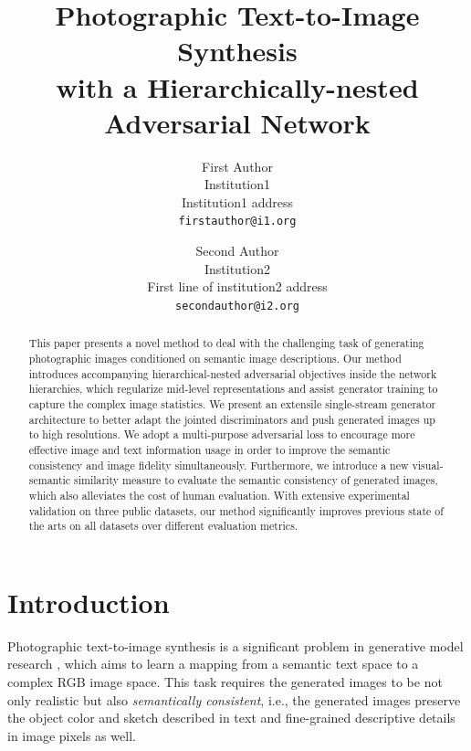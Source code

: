 \documentclass[10pt,twocolumn,letterpaper]{article}
\begin{document}
\title{Photographic Text-to-Image Synthesis \\ with a Hierarchically-nested Adversarial Network}

\author{First Author\\
Institution1\\
Institution1 address\\
{\tt\small firstauthor@i1.org}
\and
Second Author\\
Institution2\\
First line of institution2 address\\
{\tt\small secondauthor@i2.org}
}

\maketitle

\begin{abstract}
This paper presents a novel method to deal with the challenging task of generating photographic images conditioned on semantic image descriptions.
Our method introduces accompanying hierarchical-nested adversarial objectives inside the network hierarchies, which regularize mid-level representations and assist generator training to capture the complex image statistics. We present an extensile single-stream generator architecture to better adapt the jointed discriminators and push generated images up to high resolutions. We adopt a multi-purpose adversarial loss to encourage more effective image and text information usage in order to improve the semantic consistency and image fidelity simultaneously. Furthermore, we introduce a new visual-semantic similarity measure to evaluate the semantic consistency of generated images, which also alleviates the cost of human evaluation. With extensive experimental validation on three public datasets, our method significantly improves previous state of the arts on all datasets over different evaluation metrics. 


\end{abstract}


\section{Introduction}
Photographic text-to-image synthesis is a significant problem in generative model research \cite{reed2016generative}, which aims to learn a mapping from a semantic text space to a complex RGB image space. This task requires the generated images to be not only realistic but also \textit{semantically consistent}, i.e., the generated images preserve the object color and sketch described in text and fine-grained descriptive details in image pixels as well. 
\end{document}
